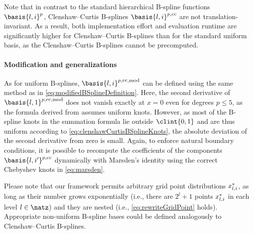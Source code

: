Note that in contrast to the standard hierarchical B-spline functions
$\basis{l,i}^p$, Clenshaw--Curtis B-splines
$\basis{l,i}^{p,\clenshawcurtis}$ are not translation-invariant.
As a result, both implementation effort and evaluation runtime
are significantly higher for Clenshaw--Curtis B-splines than
for the standard uniform basis,
as the Clenshaw--Curtis B-splines cannot be precomputed.

\paragraph{Modification and generalizations}

As for uniform B-splines,
$\basis{l,i}^{p,\clenshawcurtis,\modified}$ can be defined using the
same method as in \eqref{eq:modifiedBSplineDefinition}.
Here, the second derivative of $\basis{l,1}^{p,\clenshawcurtis,\modified}$
does not vanish exactly at $x = 0$ even for degrees $p \le 5$,
as the formula derived from  assumes uniform knots.
However, as most of the B-spline knots in the summation formula
lie outside $\clint{0, 1}$ and are thus uniform according
to \eqref{eq:clenshawCurtisBSplineKnots},
the absolute deviation of the second derivative from zero is small.
Again, to enforce natural boundary conditions,
it is possible to recompute the coefficients
of the components $\basis{l,i'}^{p,\clenshawcurtis}$
dynamically with Marsden's identity using the correct Chebyshev knots
in \eqref{eq:marsden}.

Please note that our framework permits arbitrary grid point distributions
$x_{l,i}^\ast$,
as long as their number grows exponentially
(i.e., there are $2^l + 1$ points $x_{l,i}^\ast$ in each level $l \in \natz$)
and they are nested
(i.e., \eqref{eq:rewriteGridPoint} holds).
Appropriate non-uniform B-spline bases could be defined analogously
to Clenshaw--Curtis B-splines.
